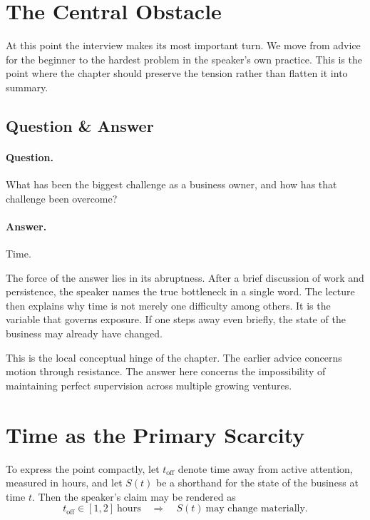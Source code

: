 \section{The Central Obstacle}

At this point the interview makes its most important turn. We move from advice for the beginner to the hardest problem in the speaker's own practice. This is the point where the chapter should preserve the tension rather than flatten it into summary.

\subsection{Question \& Answer}

\paragraph{Question.}
What has been the biggest challenge as a business owner, and how has that challenge been overcome?

\paragraph{Answer.}
Time.

The force of the answer lies in its abruptness. After a brief discussion of work and persistence, the speaker names the true bottleneck in a single word. The lecture then explains why time is not merely one difficulty among others. It is the variable that governs exposure. If one steps away even briefly, the state of the business may already have changed.

This is the local conceptual hinge of the chapter. The earlier advice concerns motion through resistance. The answer here concerns the impossibility of maintaining perfect supervision across multiple growing ventures.

\section{Time as the Primary Scarcity}

To express the point compactly, let \(t_{\mathrm{off}}\) denote time away from active attention, measured in hours, and let \(S(t)\) be a shorthand for the state of the business at time \(t\). Then the speaker's claim may be rendered as
\begin{equation}
t_{\mathrm{off}} \in [1,2]\ \text{hours}
\quad \Longrightarrow \quad
S(t)\ \text{may change materially}.
\end{equation}

